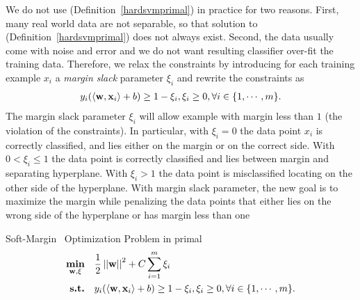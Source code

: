 {%
We do not use (Definition~\ref{hardsvmprimal}) in practice for two reasons. 
First, many real world data are not separable, so that solution to (Definition~\ref{hardsvmprimal}) does not always exist.
Second, the data usually come with noise and error and we do not want resulting classifier over-fit the training data.
Therefore, we relax the constraints by introducing for each training example $x_i$ a \textit{margin slack} parameter $\xi_i$ and rewrite the constraints as 
\begin{align}
	y_i(\langle \mathbf {w}, \mathbf {x}_i \rangle + b) \ge 1-\xi_i, \xi_i\ge 0, \forall i\in\{1,\cdots,m\}. \label{softsvmconstraint}
\end{align}
The margin slack parameter $\xi_i$ will allow example with margin less than $1$ (the violation of the constraints).
In particular, with $\xi_i=0$ the data point $x_i$ is correctly classified, and lies either on the margin or on the correct side.
With $0<\xi_i\le 1$ the data point is correctly classified and lies between margin and separating hyperplane.
With $\xi_i>1$ the data point is misclassified locating on the other side of the hyperplane.
With margin slack parameter, the new goal is to maximize the margin while penalizing the data points that either lies on the wrong side of the hyperplane or has margin less than one
\begin{definition}{Soft-Margin \svm\ Optimization Problem in primal}\label{softsvmprimal}
	\begin{align*}
		\underset{\mathbf {w},\xi}{\textbf{min}} & \quad\frac{1}{2}\left|\left| \mathbf {w} \right|\right|^2 + C\sum_{i=1}^{m}\xi_i\\
		\textbf{s.t.} & \quad y_i(\langle \mathbf {w}, \mathbf {x}_i \rangle + b) \ge 1-\xi_i, \xi_i\ge 0, \forall i\in\{1,\cdots,m\}.
	\end{align*}
\end{definition}

}
